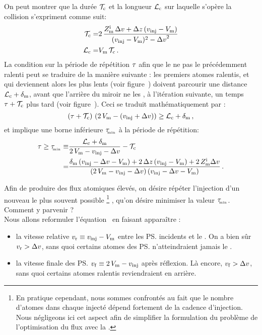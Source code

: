 \noindent On peut montrer que la durée $\mathcal{T}_{\rm c}$ et la longueur $\mathcal{L}_{\rm c}$ sur laquelle s'opère la collision s'expriment comme suit:
\begin{align}
	\Tcol =& 2\,\frac{\Zmirini\,\Dv + \Dz\,(\vinj-\Vmir)}{(\vinj-\Vmir)^2 - \Dv^2} 
	\nonumber \\
	\Lcol =& \Vmir\,\Tcol
	\pointformule
	\label{eq:TcolLcol}
\end{align}
La condition sur la période de répétition $\tau$ afin que le \mimo ne  pas le \pat précédemment ralenti peut se traduire de la manière suivante : les premiers atomes ralentis, et qui deviennent alors les plus lents (voir figure~) doivent parcourir une distance $\mathcal{L}_{\rm c} + {\delta_{\rm m}}$, avant que l'arrière du miroir ne les , à l'itération suivante, un temps $\tau + \mathcal{T}_{\rm c}$ plus tard (voir figure~). Ceci se traduit mathématiquement par :
\[
	(\tau + \mathcal{T}_{\rm c})\,\left( 2\,V_{\rm {m}} - (v_{{\rm {inj}}}+{\Delta v}) \right) \geq \mathcal{L}_{\rm c} + {\delta_{\rm m}}
	\, ,
\] 
et implique une borne inférieure ${\tau_{_{\hspace{-2pt} \rm min}}}$ à la période de répétition:%
%
\begin{align}
	\Trep \geq \Trepmin \equiv & \frac{\Lcol + \EpMir}{2\,\Vmir - \vinj - \Dv} - \Tcol \nonumber \\
	= & \frac
	{ \EpMir\,(\vinj - \Dv - \Vmir) + 2\,\Dz\,(\vinj - \Vmir) + 2\, \Zmirini \Dv
	}
	{ (2\,\Vmir - \vinj - \Dv)\,(\vinj - \Dv - \Vmir)
	} 
	\pointformule
	\label{eq:DefTrepMin}
\end{align}

\noindent Afin de produire des flux atomiques élevés, on désire répéter l'injection d'un nouveau \p le plus souvent possible%
\footnote{En pratique cependant, nous sommes confrontés au fait que le nombre d'atomes dans chaque \p injecté dépend fortement de la cadence d'injection. Nous négligeons ici cet aspect afin de simplifier la formulation du problème de l'optimisation du flux avec la \techmimo.}%
, \cad qu'on désire minimiser la valeur ${\tau_{_{\hspace{-2pt} \rm min}}}$.\\
Comment y parvenir ?\\
Nous allons reformuler l'équation~ en faisant apparaître :
\begin{itemize}
	\item la vitesse relative ${v_{\rm r}} \equiv v_{{\rm {inj}}} - V_{\rm {m}}$ entre les \ps incidents et le \mimo.
	On a bien sûr ${v_{\rm r}}>{\Delta v}$, sans quoi certains atomes des \ps n'atteindraient jamais le \mi.
	\item la vitesse finale des \ps ${v_{\rm f}} \equiv 2\,V_{\rm {m}}-v_{{\rm {inj}}}$ après réflexion. Là encore, ${v_{\rm f}}>{\Delta v}$, sans quoi certains atomes ralentis reviendraient en arrière.
\end{itemize} 
%

